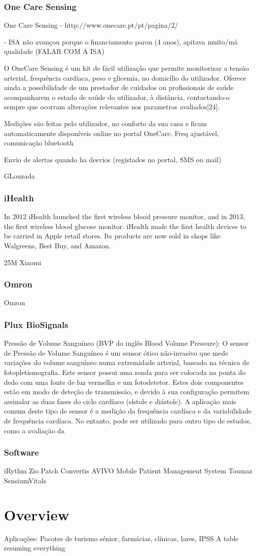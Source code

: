 \subsubsection{One Care Sensing}
One Care Sensing - http://www.onecare.pt/pt/pagina/2/

- ISA não avançou porque o financiamento parou (4 anos), apitava muito/má qualidade (FALAR COM A ISA)

O OneCare Sensing é um kit de fácil utilização que permite monitorizar a tensão arterial, frequência cardíaca, peso e glicemia, no domicílio do utilizador. Oferece ainda a possibilidade
de um prestador de cuidados ou profissionais de saúde acompanharem o estado de saúde do utilizador, à distância, contactando-o sempre que ocorram alterações relevantes nos parametros avaliados[24]. 

Medições são feitas pelo utilizador, no conforto da sua casa e ficam automaticamente disponíveis online no portal OneCare. Freq ajustável, comunicação bluetooth 

Envio de alertas quando ha desvios (registados no portal, SMS ou mail)

GLouzada

\subsubsection{iHealth}
In 2012 iHealth launched the first wireless blood pressure monitor, and in 2013, the first wireless blood glucose monitor. iHealth made the first health devices to be carried in Apple retail stores. Its products are now sold in shops like Walgreens, Best Buy, and Amazon.

25M Xiaomi

\subsubsection{Omron} 

Omron

\subsubsection{Plux BioSignals}
Pressão de Volume Sanguíneo (BVP do inglês Blood Volume Pressure): O sensor de Pressão de Volume Sanguíneo é um sensor ótico não-invasivo que mede variações do volume sanguíneo numa extremidade arterial, baseado na técnica de fotopletismografia. Este sensor possui uma sonda para ser colocada na ponta do dedo com uma fonte de luz vermelha e um fotodetetor. Estes dois componentes estão em modo de deteção de transmissão, e devido à sua configuração permitem assinalar as duas fases do ciclo cardíaco (sístole e diástole). A aplicação mais comum deste tipo de sensor é a medição da frequência cardíaca e da variabilidade de frequência cardíaca.
No entanto, pode ser utilizado para outro tipo de estudos, como a avaliação da




\subsubsection{Software}
iRythm Zio Patch
Convertis AVIVO Mobile Patient Management System
Toumaz SensiumVitals

\section{Overview}

Aplicações: Pacotes de turismo sénior, farmácias, clínicas, lares, IPSS
A table resuming everything